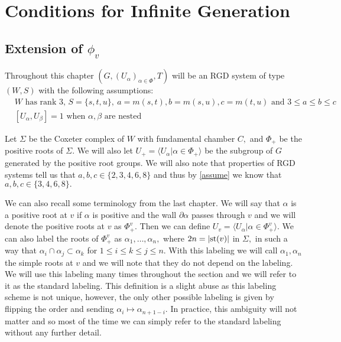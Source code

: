 \documentclass[class=book, crop=false,12 pt]{standalone}
\begin{document}
\chapter{Conditions for Infinite Generation}
\section{Extension of $\phi_v$}

Throughout this chapter $(G,(U_\alpha)_{\alpha\in \Phi},T)$ will be an RGD system of type $(W,S)$ with the following assumptions:
\smallskip
\begin{equation}
	\tag{A} 
\begin{aligned}
	&W \text{ has rank 3, }S=\{s,t,u\},\: a=m(s,t),b=m(s,u),c=m(t,u)\text{ and }3\le a\le b\le c\\
	&[U_\alpha,U_\beta]=1\text{ when }\alpha,\beta \text{ are nested}
\end{aligned}
\end{equation}
\smallskip

Let $\Sigma$ be the Coxeter complex of $W$ with fundamental chamber $C,$ and $\Phi_+$ be the positive roots of $\Sigma.$ We will also let $U_+=\langle U_\alpha|\alpha\in \Phi_+\rangle$ be the subgroup of $G$ generated by the positive root groups. We will also note that properties of RGD systems tell us that $a,b,c\in \{2,3,4,6,8\}$ and thus by \eqref{assume} we know that $a,b,c\in \{3,4,6,8\}.$



We can also recall some terminology from the last chapter. We will say that $\alpha$ is a positive root at $v$ if $\alpha$ is positive and the wall $\partial\alpha$ passes through $v$ and we will denote the positive roots at $v$ as $\Phi^v_+.$ Then we can define $U_v=\langle U_\alpha|\alpha\in \Phi^v_+\rangle.$ We can also label the roots of $\Phi^v_+$ as $\alpha_1,\dots,\alpha_n,$ where $2n=|\mathrm{st}(v)|$ in $\Sigma,$ in such a way that $\alpha_i\cap \alpha_j\subset \alpha_k$ for $1\le i\le k\le j\le n.$ With this labeling we will call $\alpha_1,\alpha_n$ the simple roots at $v$ and we will note that they do not depend on the labeling. We will use this labeling many times throughout the section and we will refer to it as the standard labeling. This definition is a slight abuse as this labeling scheme is not unique, however, the only other possible labeling is given by flipping the order and sending $\alpha_i\mapsto \alpha_{n+1-i}.$ In practice, this ambiguity will not matter and so most of the time we can simply refer to the standard labeling without any further detail.
\end{document}
